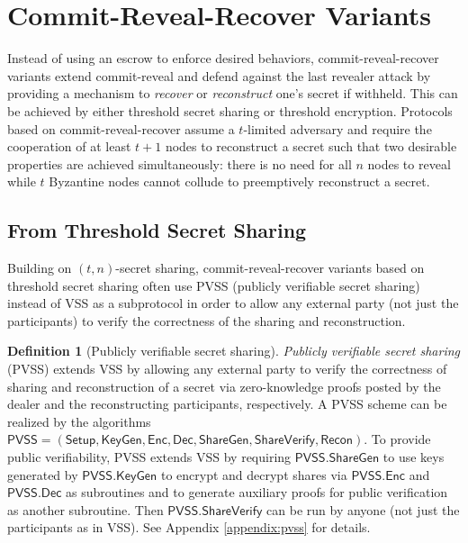 \documentclass[letterpaper,twocolumn,10pt]{article}
\theoremstyle{definition}
\newtheorem{definition}[theorem]{Definition}
\theoremstyle{remark}
\begin{document}
\section{Commit-Reveal-Recover Variants}
\label{section:commit-reveal-recover}
Instead of using an escrow to enforce desired behaviors, commit-reveal-recover variants extend commit-reveal and defend against the last revealer attack by providing a mechanism to \textit{recover} or \textit{reconstruct} one's secret if withheld. This can be achieved by either threshold secret sharing or threshold encryption. Protocols based on commit-reveal-recover assume a $t$-limited adversary and require the cooperation of at least $t + 1$ nodes to reconstruct a secret such that two desirable properties are achieved simultaneously: there is no need for all $n$ nodes to reveal while $t$ Byzantine nodes cannot collude to preemptively reconstruct a secret.

\subsection{From Threshold Secret Sharing}
Building on $(t, n)$-secret sharing, commit-reveal-recover variants based on threshold secret sharing often use PVSS (publicly verifiable secret sharing) \cite{schoenmakers1999simple, cascudo2017scrape} instead of VSS as a subprotocol in order to allow any external party (not just the participants) to verify the correctness of the sharing and reconstruction.

\begin{definition}[Publicly verifiable secret sharing]
\textit{Publicly verifiable secret sharing} (PVSS) extends VSS by allowing any external party to verify the correctness of sharing and reconstruction of a secret via zero-knowledge proofs posted by the dealer and the reconstructing participants, respectively. A PVSS scheme can be realized by the algorithms $\mathsf{PVSS} = (\mathsf{Setup}, \mathsf{KeyGen}, \mathsf{Enc}, \mathsf{Dec}, \mathsf{ShareGen}, \mathsf{ShareVerify}, \mathsf{Recon})$. To provide public verifiability, PVSS extends VSS by requiring $\mathsf{PVSS.ShareGen}$ to use keys generated by $\mathsf{PVSS.KeyGen}$ to encrypt and decrypt shares via $\mathsf{PVSS.Enc}$ and $\mathsf{PVSS.Dec}$ as subroutines and to generate auxiliary proofs for public verification as another subroutine. Then $\mathsf{PVSS.ShareVerify}$ can be run by anyone (not just the participants as in VSS). See Appendix \ref{appendix:pvss} for details.
\end{definition}
\end{document}
